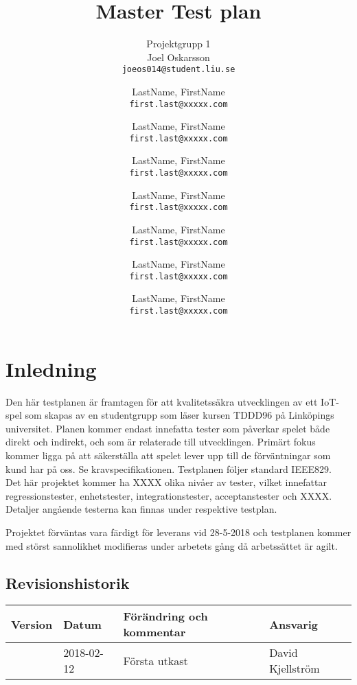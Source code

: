 \documentclass[10pt]{article}
\title{Master Test plan}
\author{
	Projektgrupp 1\\
	Joel Oskarsson\\
	\texttt{joeos014@student.liu.se}
	\and
	LastName, FirstName\\
	\texttt{first.last@xxxxx.com}
	\and
	LastName, FirstName\\
	\texttt{first.last@xxxxx.com}
	\and
	LastName, FirstName\\
	\texttt{first.last@xxxxx.com}
	\and
	LastName, FirstName\\
	\texttt{first.last@xxxxx.com}
  	\and
  	LastName, FirstName\\
  	\texttt{first.last@xxxxx.com}
  	\and
  	LastName, FirstName\\
  	\texttt{first.last@xxxxx.com}
  	\and
  	LastName, FirstName\\
  	\texttt{first.last@xxxxx.com}
}
\begin{document}
\maketitle
\pagebreak
\tableofcontents
\pagebreak
\section{Inledning}
	Den här testplanen är framtagen för att kvalitetssäkra utvecklingen av ett IoT-spel som skapas av en studentgrupp som läser kursen TDDD96 på Linköpings universitet. Planen kommer endast innefatta tester som påverkar spelet både direkt och indirekt, och som är relaterade till utvecklingen. Primärt fokus kommer ligga på att säkerställa att spelet lever upp till de förväntningar som kund har på oss. {\color{red}Se kravspecifikationen}. Testplanen följer standard IEEE829. \\

Det här projektet kommer ha {\color{red}XXXX} olika nivåer av tester, vilket innefattar regressionstester, enhetstester, integrationstester, acceptanstester och {\color{red}XXXX}. Detaljer angående testerna kan finnas under respektive testplan.

Projektet förväntas vara färdigt för leverans vid {\color{red}28-5-2018} och testplanen kommer med störst sannolikhet modifieras under arbetets gång då arbetssättet är agilt.

	\subsection{Revisionshistorik}

	
	\begin{center}
 	   \begin{tabular}{| l | l | l |  l | }
 	       \hline
 	       \textbf{Version} & \textbf{Datum} & \textbf{Förändring och kommentar} & \textbf{Ansvarig} \\
 	       \hline
 	       \centering 0.1 & 2018-02-12 & Första utkast & David Kjellström\\
 	       \hline
 	   \end{tabular}
	\end{center}
\end{document}
